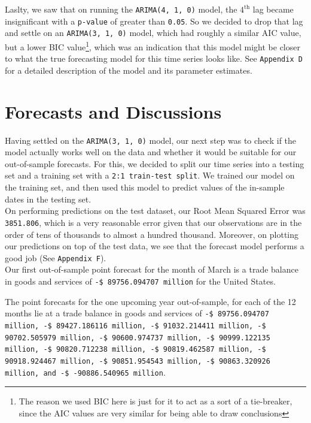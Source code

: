 \documentclass[12pt]{article}
\begin{document}
Laslty, we saw that on running the \texttt{ARIMA(4, 1, 0)} model, the $4^\text{th}$ lag became insignificant with a \texttt{p-value} of greater than \texttt{0.05}. So we decided to drop that lag and settle on an \texttt{ARIMA(3, 1, 0)} model, which had roughly a similar AIC value, but a lower BIC value\footnote{The reason we used BIC here is just for it to act as a sort of a tie-breaker, since the AIC values are very similar for being able to draw conclusions}, which was an indication that this model might be closer to what the true forecasting model for this time series looks like. See \texttt{Appendix D} for a detailed description of the model and its parameter estimates. 

\section{Forecasts and Discussions}

Having settled on the \texttt{ARIMA(3, 1, 0)} model, our next step was to check if the model actually works well on the data and whether it would be suitable for our out-of-sample forecasts. For this, we decided to split our time series into a testing set and a training set with a \texttt{2:1 train-test split}. We trained our model on the training set, and then used this model to predict values of the in-sample dates in the testing set.\\

On performing predictions on the test dataset, our Root Mean Squared Error\cite{rmse} was \texttt{3851.806}, which is a very reasonable error given that our observations are in the order of tens of thousands to almost a hundred thousand. Moreover, on plotting our predictions on top of the test data, we see that the forecast model performs a good job (See \texttt{Appendix F}).\\

Our first out-of-sample point forecast for the month of March is a trade balance in goods and services of \texttt{-\$ 89756.094707 million} for the United States. 

The point forecasts for the one upcoming year out-of-sample, for each of the 12 months lie at a trade balance in goods and services of \texttt{-\$ 89756.094707 million, -\$ 89427.186116 million, -\$ 91032.214411 million, -\$ 90702.505979 million, -\$ 90600.974737 million, -\$ 90999.122135 million, -\$ 90820.712238 million, -\$ 90819.462587 million, -\$ 90918.924467 million, -\$ 90851.954543 million, -\$ 90863.320926 million, and -\$ -90886.540965 million}.\\
\end{document}
